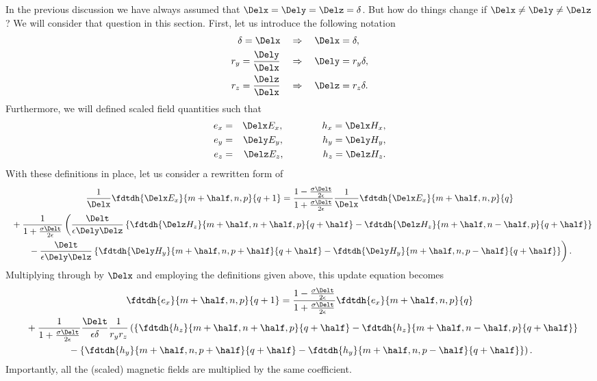 In the previous discussion we have always assumed that
$\Delx=\Dely=\Delz=\delta$.  But how do things change if
$\Delx\neq\Dely\neq\Delz$?  We will consider that question in this
section.  First, let us introduce the following notation
\begin{align*}
\delta  =  \Delx &\quad \Rightarrow \quad \Delx = \delta,\\
r_y     =  \frac{\Dely}{\Delx} &\quad \Rightarrow \quad \Dely = r_y \delta,\\
r_z     =  \frac{\Delz}{\Delx} &\quad \Rightarrow \quad \Delz = r_z \delta.
\end{align*}
Furthermore, we will defined scaled field quantities such that
\begin{eqnarray*}
e_x & = & \Delx E_x, \qquad\qquad h_x  =  \Delx H_x, \\
e_y & = & \Dely E_y, \qquad\qquad h_y  =  \Dely H_y, \\
e_z & = & \Delz E_z, \qquad\qquad h_z  =  \Delz H_z.
\end{eqnarray*}
With these definitions in place, let us consider a rewritten form of
\begin{multline}
  \frac{1}{\Delx}\fdtdh{\Delx E_x}{m+\half,n,p}{q+1} =
   \frac{1-\frac{\sigma\Delt}{2\epsilon}}{1+\frac{\sigma\Delt}{2\epsilon}}
   \frac{1}{\Delx}\fdtdh{\Delx E_x}{m+\half,n,p}{q} \\
   \hspace{.08in}\mbox{} +
   \frac{1}{1+\frac{\sigma\Delt}{2\epsilon}}
    \left(
    \frac{\Delt}{\epsilon\Dely\Delz}
    \left\{\fdtdh{\Delz H_z}{m+\half,n+\half,p}{q+\half}-
           \fdtdh{\Delz H_z}{m+\half,n-\half,p}{q+\half}\right\}\right.
   \\
    \left. \mbox{} -
    \frac{\Delt}{\epsilon\Dely\Delz}
    \left\{\fdtdh{\Dely H_y}{m+\half,n,p+\half}{q+\half}-
           \fdtdh{\Dely H_y}{m+\half,n,p-\half}{q+\half}\right\}\right).
\end{multline}
Multiplying through by $\Delx$ and employing the definitions given
above, this update equation becomes
\begin{multline}
  \fdtdh{e_x}{m+\half,n,p}{q+1} =
   \frac{1-\frac{\sigma\Delt}{2\epsilon}}{1+\frac{\sigma\Delt}{2\epsilon}}
   \fdtdh{e_x}{m+\half,n,p}{q} \\
   \hspace{.08in}\mbox{} +
   \frac{1}{1+\frac{\sigma\Delt}{2\epsilon}}
    \frac{\Delt}{\epsilon\delta}\frac{1}{r_yr_z}
    \left(
    \left\{\fdtdh{h_z}{m+\half,n+\half,p}{q+\half}-
           \fdtdh{h_z}{m+\half,n-\half,p}{q+\half}\right\}\right.
   \\
    \left. \mbox{} -
    \left\{\fdtdh{h_y}{m+\half,n,p+\half}{q+\half}-
           \fdtdh{h_y}{m+\half,n,p-\half}{q+\half}\right\}\right).
\end{multline}
Importantly, all the (scaled) magnetic fields are multiplied by the
same coefficient.  


